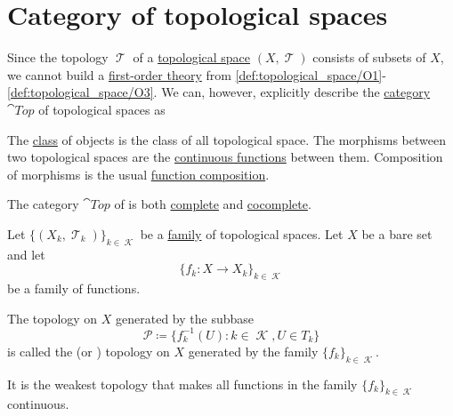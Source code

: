 \section{Category of topological spaces}\label{sec:category_of_topological_spaces}

\begin{definition}\label{def:category_of_small_topological_spaces}
  Since the topology \( \mscrT \) of a \hyperref[def:topological_space]{topological space} \( (X, \mscrT) \) consists of subsets of \( X \), we cannot build a \hyperref[def:first_order_theory]{first-order theory} from \cref{def:topological_space/O1}-\cref{def:topological_space/O3}. We can, however, explicitly describe the \hyperref[def:category]{category} \( \cat{Top} \) of topological spaces as
  \begin{refenum}
     The \hyperref[def:set]{class} of objects is the class of all topological space.
     The morphisms between two topological spaces are the \hyperref[def:global_continuity]{continuous functions} between them.
     Composition of morphisms is the usual \hyperref[def:set_valued_map/composition]{function composition}.
  \end{refenum}
\end{definition}

\begin{theorem}\label{thm:top_complete_cocomplete}
  The category \( \cat{Top} \) of is both \hyperref[def:category_of_cones/limit]{complete} and \hyperref[def:category_of_cones/colimit]{cocomplete}.
\end{theorem}

\begin{definition}\label{def:initial_topology}
  Let \( \{ (X_k, \mscrT_k) \}_{k \in \mscrK} \) be a \hyperref[def:indexed_family]{family} of topological spaces. Let \( X \) be a bare set and let
  \begin{equation*}
    \{ f_k: X \to X_k \}_{k \in \mscrK}
  \end{equation*}
  be a family of functions.

  The topology on \( X \) generated by the subbase
  \begin{equation*}
    \mathcal{P} \coloneqq \{ f_k^{-1}(U) \colon k \in \mscrK, U \in T_k \}
  \end{equation*}
  is called the  (or ) topology on \( X \) generated by the family \( \{ f_k \}_{k \in \mscrK} \).

  It is the weakest topology that makes all functions in the family \( \{ f_k \}_{k \in \mscrK} \) continuous.
\end{definition}

